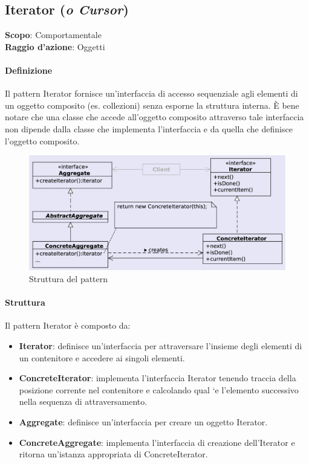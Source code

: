 \subsection{Iterator (\textit{o Cursor})}
\label{iterator}

\textbf{Scopo}: Comportamentale \\
\textbf{Raggio d'azione}: Oggetti

\paragraph{Definizione} Il pattern Iterator fornisce un'interfaccia di accesso sequenziale agli elementi di un oggetto composito (es. collezioni) senza esporne la struttura interna. È bene notare che una classe che accede all’oggetto composito attraverso tale interfaccia non dipende dalla classe che implementa l’interfaccia e da quella che definisce l’oggetto composito.

\begin{figure}[H]
    \centering
    \includegraphics[width=1\linewidth]{assets/pattern/iterator/iterator-struttura.png}
    \caption{Struttura del pattern}
\end{figure}

\paragraph{Struttura} Il pattern Iterator è composto da:
\begin{itemize}
    \item \textbf{Iterator}: definisce un’interfaccia per attraversare l’insieme degli elementi di un contenitore e accedere ai singoli elementi.
    \item \textbf{ConcreteIterator}: implementa l’interfaccia Iterator tenendo traccia della posizione corrente nel contenitore e calcolando qual `e l’elemento successivo nella sequenza di attraversamento. 
    \item \textbf{Aggregate}: definisce un’interfaccia per creare un oggetto Iterator. 
    \item \textbf{ConcreteAggregate}: implementa l’interfaccia di creazione dell’Iterator e ritorna un’istanza appropriata di ConcreteIterator.
\end{itemize}

